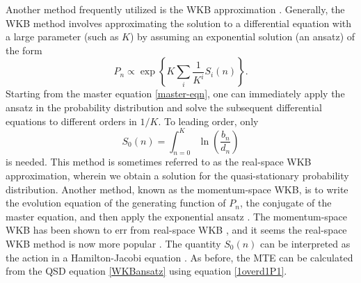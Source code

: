 Another method frequently utilized is the WKB approximation \cite{Doering2005,Assaf2006,Kessler2007,Kamenev2008,Assaf2010,Ovaskainen2010,Gottesman2012,Assaf2016,Yu2017}. 
Generally, the WKB method involves approximating the solution to a differential equation with a large parameter (such as $K$) by assuming an exponential solution (an ansatz) of the form \cite{Assaf2016}
\begin{equation}
P_n \propto \exp \left\{ K \sum_i \frac{1}{K^i}S_i(n) \right\}.
 \label{WKBansatz}
\end{equation}
Starting from the master equation \ref{master-eqn}, one can immediately apply the ansatz in the probability distribution and solve the subsequent differential equations to different orders in $1/K$\cite{Assaf2016}. %
To leading order, only 
\begin{equation}
S_0(n) = \int_{n=0}^{K} \ln\left(\frac{b_n}{d_n}\right)
 \label{WKBaction}
\end{equation}
is needed. 
This method is sometimes referred to as the real-space WKB approximation, wherein we obtain a solution for the quasi-stationary probability distribution.
Another method, known as the momentum-space WKB, is to write the evolution equation of the generating function of $P_n$, the conjugate of the master equation, and then apply the exponential ansatz \cite{Assaf2006,Assaf2016}. 
The momentum-space WKB has been shown to err from real-space WKB \cite{Ovaskainen2010,Assaf2016}, and it seems the real-space WKB method is now more popular \cite{Kessler2007,Kamenev2008,Assaf2010,Ovaskainen2010,Gottesman2012,Assaf2016,Yu2017}. 
The quantity $S_0(n)$ can be interpreted as the action in a Hamilton-Jacobi equation \cite{Assaf2016}. 
As before, the MTE can be calculated from the QSD equation \ref{WKBansatz} using equation \ref{1overd1P1}. 

